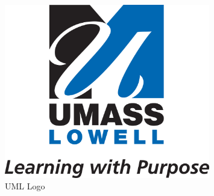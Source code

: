 \begin{figure}[ht]
    \centering
    \includegraphics[width=0.8\textwidth]{uml_logo.png}
    \caption{UML Logo}
\end{figure}